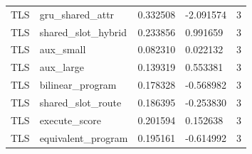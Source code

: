\begin{tabular}{lllll}
TLS & gru\_shared\_attr & 0.332508 & -2.091574 & 3 \\
TLS & shared\_slot\_hybrid & 0.233856 & 0.991659 & 3 \\
TLS & aux\_small & 0.082310 & 0.022132 & 3 \\
TLS & aux\_large & 0.139319 & 0.553381 & 3 \\
TLS & bilinear\_program & 0.178328 & -0.568982 & 3 \\
TLS & shared\_slot\_route & 0.186395 & -0.253830 & 3 \\
TLS & execute\_score & 0.201594 & 0.152638 & 3 \\
TLS & equivalent\_program & 0.195161 & -0.614992 & 3 \\
\hline
\end{tabular}
